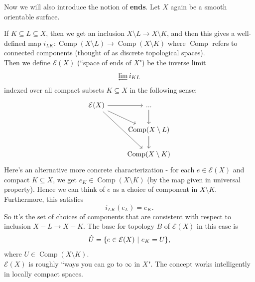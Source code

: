 \documentclass{article}
\begin{document}
Now we will also introduce the notion of \textbf{ends}. Let $X$ again be a smooth orientable surface.
\begin{definition}
If $K \subseteq L \subseteq X$, then we get an inclusion $X \setminus L \to X \setminus K$, and then this gives a well-defined map $i_{LK}: \operatorname{Comp}(X \setminus L) \to \operatorname{Comp}(X \setminus K)$ where $\operatorname{Comp}$ refers to connected components (thought of as discrete topological spaces).\\

Then we define $\mathcal{E}(X)$ (``space of ends of $X$") be the inverse limit
\[\varprojlim i_{KL}\]
indexed over all compact subsets $K \subseteq X$ in the following sense:
\[\begin{tikzcd}
	{\mathcal{E}(X)} & {...} \\
	& {\operatorname{Comp}(X \setminus L)} \\
	& {\operatorname{Comp}(X \setminus K)}
	\arrow[from=1-1, to=2-2]
	\arrow[from=1-1, to=3-2]
	\arrow[from=2-2, to=3-2]
	\arrow[from=1-1, to=1-2]
	\arrow[from=1-2, to=2-2]
\end{tikzcd}\]
Here's an alternative more concrete characterization - for each $e \in \mathcal{E}(X)$ and compact $K \subseteq X$, we get $e_K \in \operatorname{Comp}(X \setminus K)$ (by the map given in universal property). Hence we can think of $e$ as a choice of component in $X \setminus K$. Furthermore, this satisfies
\[i_{LK}(e_L) = e_K.\]
So it's the set of choices of components that are consistent with respect to inclusion $X - L \to X - K$. The base for topology $B$ of $\mathcal{E}(X)$ in this case is
\[\Hat{U} = \{e \in \mathcal{E}(X)\ |\ e_K = U\},\]
where $U \in \operatorname{Comp}(X \setminus K)$.\\

$\mathcal{E}(X)$ is roughly ``ways you can go to $\infty$ in $X$". The concept works intelligently in locally compact spaces.
\end{definition}
\end{document}
